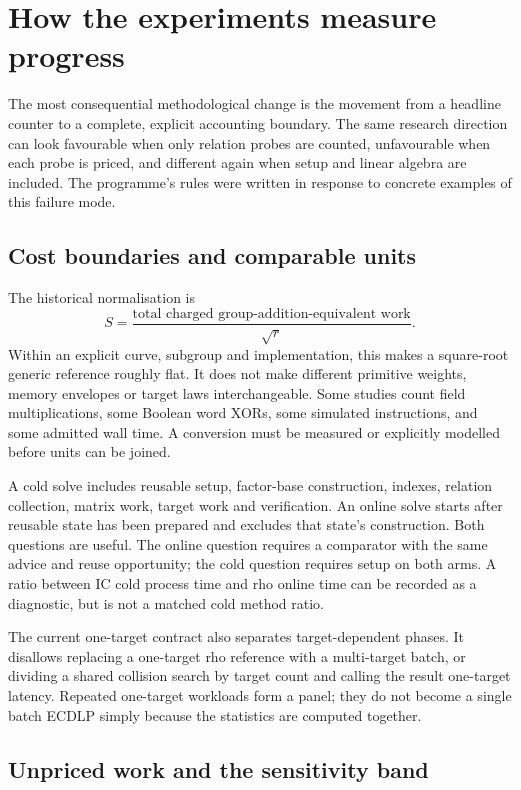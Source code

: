 \section{How the experiments measure progress}\label{sec:measurement}

The most consequential methodological change is the movement from a
headline counter to a complete, explicit accounting boundary. The same
research direction can look favourable when only relation probes are
counted, unfavourable when each probe is priced, and different again when
setup and linear algebra are included. The programme's rules were written
in response to concrete examples of this failure mode.

\subsection{Cost boundaries and comparable units}

The historical normalisation is
\[
 S=\frac{\text{total charged group-addition-equivalent work}}{\sqrt r}.
\]
Within an explicit curve, subgroup and implementation, this makes a
square-root generic reference roughly flat. It does not make different
primitive weights, memory envelopes or target laws interchangeable. Some
studies count field multiplications, some Boolean word XORs, some
simulated instructions, and some admitted wall time. A conversion must be
measured or explicitly modelled before units can be joined.

A cold solve includes reusable setup, factor-base construction, indexes,
relation collection, matrix work, target work and verification. An online
solve starts after reusable state has been prepared and excludes that
state's construction. Both questions are useful. The online question
requires a comparator with the same advice and reuse opportunity; the
cold question requires setup on both arms. A ratio between IC cold
process time and rho online time can be recorded as a diagnostic, but is
not a matched cold method ratio.

The current one-target contract also separates target-dependent phases.
It disallows replacing a one-target rho reference with a multi-target
batch, or dividing a shared collision search by target count and calling
the result one-target latency. Repeated one-target workloads form a panel;
they do not become a single batch ECDLP simply because the statistics are
computed together.

\subsection{Unpriced work and the sensitivity band}

